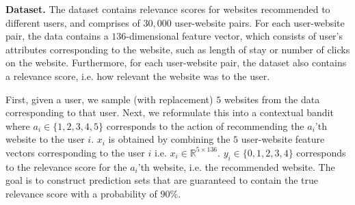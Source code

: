 \textbf{Dataset.}
The dataset contains relevance scores for websites recommended to different users, and comprises of $30,000$ user-website pairs. For each user-website pair, the data contains a $136$-dimensional feature vector, which consists of user's attributes corresponding to the website, such as length of stay or number of clicks on the website. Furthermore, for each user-website pair, the dataset also contains a relevance score, i.e. how relevant the website was to the user.


First, given a user, we sample (with replacement) $5$ websites from the data corresponding to that user. Next, we reformulate this into a contextual bandit where $a_i \in \{1,2,3,4,5\}$ corresponds to the action of recommending the $a_i$'th website to the user $i$. $x_i$ is obtained by combining the $5$ user-website feature vectors corresponding to the user $i$ i.e. $x_i \in \mathbb{R}^{5 \times 136}$. $y_i \in\{0,1,2,3,4\}$ corresponds to the relevance score for the $a_i$'th website, i.e. the recommended website. The goal is to construct prediction sets that are guaranteed to contain the true relevance score with a probability of $90\%$.


